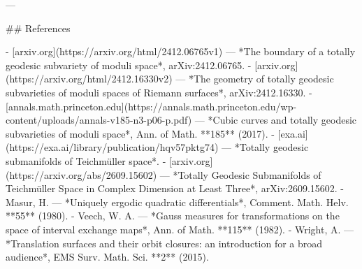 ---

## References

- [arxiv.org](https://arxiv.org/html/2412.06765v1) — *The boundary of a totally geodesic subvariety of moduli space*, arXiv:2412.06765.
- [arxiv.org](https://arxiv.org/html/2412.16330v2) — *The geometry of totally geodesic subvarieties of moduli spaces of Riemann surfaces*, arXiv:2412.16330.
- [annals.math.princeton.edu](https://annals.math.princeton.edu/wp-content/uploads/annals-v185-n3-p06-p.pdf) — *Cubic curves and totally geodesic subvarieties of moduli space*, Ann. of Math. **185** (2017).
- [exa.ai](https://exa.ai/library/publication/hqv57pktg74) — *Totally geodesic submanifolds of Teichmüller space*.
- [arxiv.org](https://arxiv.org/abs/2609.15602) — *Totally Geodesic Submanifolds of Teichmüller Space in Complex Dimension at Least Three*, arXiv:2609.15602.
- Masur, H. — *Uniquely ergodic quadratic differentials*, Comment. Math. Helv. **55** (1980).
- Veech, W. A. — *Gauss measures for transformations on the space of interval exchange maps*, Ann. of Math. **115** (1982).
- Wright, A. — *Translation surfaces and their orbit closures: an introduction for a broad audience*, EMS Surv. Math. Sci. **2** (2015).